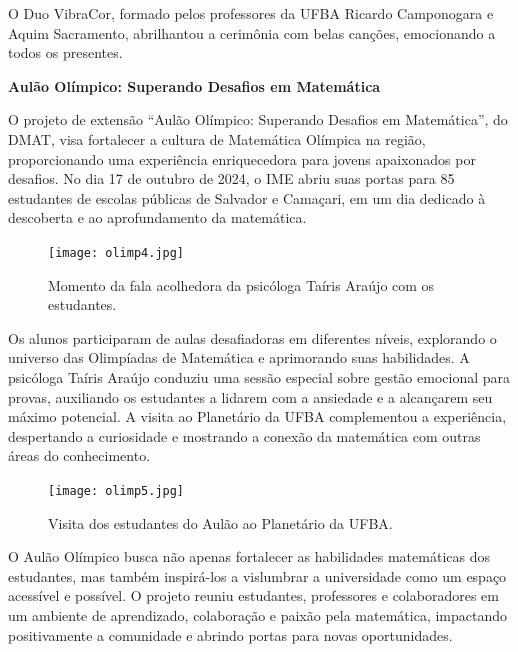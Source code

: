\documentclass{hipatia}
\begin{document}
O Duo VibraCor, formado pelos professores da UFBA Ricardo Camponogara e Aquim Sacramento, abrilhantou a cerimônia com belas canções, emocionando a todos os presentes.


\vspace{0.5cm}

{\bf \noindent Aulão Olímpico: Superando Desafios em Matemática}

\vspace{0.5cm}

O projeto de extensão ``Aulão Olímpico: Superando Desafios em Matemática'', do DMAT, visa fortalecer a cultura de Matemática Olímpica na região, proporcionando uma experiência enriquecedora para jovens apaixonados por desafios. No dia 17 de outubro de 2024, o IME abriu suas portas para 85 estudantes de escolas públicas de Salvador e Camaçari, em um dia dedicado à descoberta e ao aprofundamento da matemática.

\begin{figure}[htb]
    \centering
    \texttt{[image: olimp4.jpg]}
    \caption{Momento da fala acolhedora da psicóloga Taíris Araújo com os estudantes.}
 \label{olimp4}
\end{figure}

Os alunos participaram de aulas desafiadoras em diferentes níveis, explorando o universo das Olimpíadas de Matemática e aprimorando suas habilidades. A psicóloga Taíris Araújo conduziu uma sessão especial sobre gestão emocional para provas, auxiliando os estudantes a lidarem com a ansiedade e a alcançarem seu máximo potencial. A visita ao Planetário da UFBA complementou a experiência, despertando a curiosidade e mostrando a conexão da matemática com outras áreas do conhecimento.

\begin{figure}[htb]
    \centering
    \texttt{[image: olimp5.jpg]}
    \caption{Visita dos estudantes do Aulão ao Planetário da UFBA.}
 \label{olimp5}
\end{figure}

O Aulão Olímpico busca não apenas fortalecer as habilidades matemáticas dos estudantes, mas também inspirá-los a vislumbrar a universidade como um espaço acessível e possível. O projeto reuniu estudantes, professores e colaboradores em um ambiente de aprendizado, colaboração e paixão pela matemática, impactando positivamente a comunidade e abrindo portas para novas oportunidades.
\end{document}
